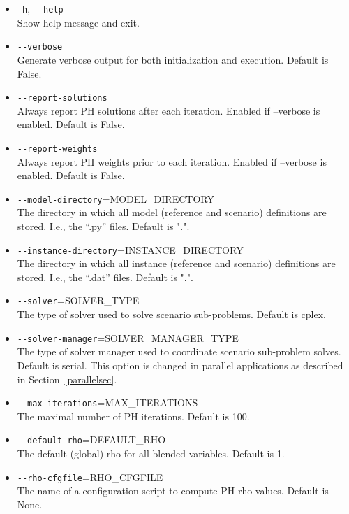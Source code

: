 \begin{itemize}
  \item \verb|-h|, \verb|--help|\\            Show help message and exit.
  \item \verb|--verbose|\\             Generate verbose output for both initialization and execution. Default is False.
  \item \verb|--report-solutions|\\     Always report PH solutions after each iteration. Enabled if --verbose is enabled. Default is False.
  \item \verb|--report-weights|\\    Always report PH weights prior to each iteration. Enabled if --verbose is enabled. Default is False.
  \item \verb|--model-directory|=MODEL\_DIRECTORY\\
                        The directory in which all model (reference and scenario) definitions are stored. I.e., the ``.py'' files. Default is ".".
  \item \verb|--instance-directory|=INSTANCE\_DIRECTORY\\
                        The directory in which all instance (reference and scenario) definitions are stored. I.e., the ``.dat'' files. Default is ".".
  \item \verb|--solver|=SOLVER\_TYPE\\  The type of solver used to solve scenario sub-problems. Default is cplex.
  \item \verb|--solver-manager|=SOLVER\_MANAGER\_TYPE\\
                        The type of solver manager used to coordinate scenario sub-problem solves. Default is serial. This option is changed in parallel applications
as described in Section~\ref{parallelsec}.
  \item \verb|--max-iterations|=MAX\_ITERATIONS\\
                        The maximal number of PH iterations. Default is 100.
  \item \verb|--default-rho|=DEFAULT\_RHO\\
                        The default (global) rho for all blended variables. Default is 1.
  \item \verb|--rho-cfgfile|=RHO\_CFGFILE\\
                        The name of a configuration script to compute PH rho values. Default is None.

\end{itemize}
